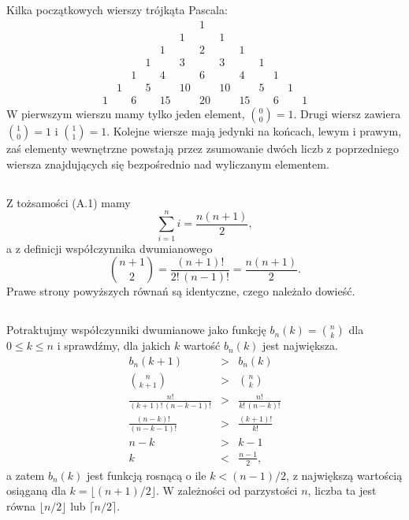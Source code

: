\subsection{} %
Kilka początkowych wierszy trójkąta Pascala:
\[
	\begin{array}{ccccccccccccc}
		&&&&&& 1 \\
		&&&&& 1 && 1 \\
		&&&& 1 && 2 && 1 \\
		&&& 1 && 3 && 3 && 1 \\
		&& 1 && 4 && 6 && 4 && 1 \\
		& 1 && 5 && 10 && 10 && 5 && 1 \\
		1 && 6 && 15 && 20 && 15 && 6 && 1
	\end{array}
\]
W pierwszym wierszu mamy tylko jeden element, $\binom{0}{0}=1$. Drugi wiersz zawiera $\binom{1}{0}=1$ i $\binom{1}{1}=1$. Kolejne wiersze mają jedynki na końcach, lewym i prawym, zaś elementy wewnętrzne powstają przez zsumowanie dwóch liczb z poprzedniego wiersza znajdujących się bezpośrednio nad wyliczanym elementem.

\subsection{} %
Z tożsamości (A.1) mamy
\[
	\sum_{i=1}^ni = \frac{n(n+1)}{2},
\]
a z definicji współczynnika dwumianowego
\[
	\binom{n+1}{2} = \frac{(n+1)!}{2!\,(n-1)!} = \frac{n(n+1)}{2}.
\]
Prawe strony powyższych równań są identyczne, czego należało dowieść.

\subsection{} %
Potraktujmy współczynniki dwumianowe jako funkcję $b_n(k)=\binom{n}{k}$ dla $0\le k\le n$ i sprawdźmy, dla jakich $k$ wartość $b_n(k)$ jest największa.
\begin{eqnarray*}
	b_n(k+1) &>& b_n(k) \\
	\binom{n}{k+1} &>& \binom{n}{k} \\
	\frac{n!}{(k+1)!\,(n-k-1)!} &>& \frac{n!}{k!\,(n-k)!} \\
	\frac{(n-k)!}{(n-k-1)!} &>& \frac{(k+1)!}{k!} \\
	n-k &>& k-1 \\
	k &<& \frac{n-1}{2},
\end{eqnarray*}
a zatem $b_n(k)$ jest funkcją rosnącą o ile $k<(n-1)/2$, z największą wartością osiąganą dla $k=\lfloor(n+1)/2\rfloor$. W zależności od parzystości $n$, liczba ta jest równa $\lfloor n/2\rfloor$ lub $\lceil n/2\rceil$.


